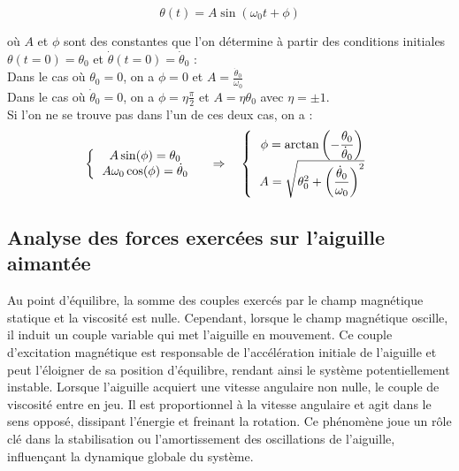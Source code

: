 \documentclass[a4paper,12pt,twoside]{article}
\begin{document}
\begin{equation}
    \theta(t) = A\sin(\omega_0t+\phi)
\end{equation}

\noindent où $A$ et $\phi$ sont des constantes que l'on détermine à partir des conditions initiales $\theta(t=0) = \theta_0$ et $\dot{\theta}(t=0) = \dot{\theta}_0$ :\\
Dans le cas où  $\theta_0 = 0$, on a $\phi = 0$ et $A = \frac{\dot{\theta}_0}{\omega_0}$ \\
Dans le cas où $\dot{\theta}_0 = 0$, on a $\phi =\eta \frac{\pi}{2}$ et $A = \eta\theta_0$ avec $\eta = \pm 1$. \\
Si l'on ne se trouve pas dans l'un de ces deux cas, on a :
\begin{equation}
    \left\{ \begin{tabular}{c}
      $A\sin(\phi)=\theta_0$     \\
      $A\omega_0\cos(\phi)=\dot{\theta}_0$ 
    \end{tabular}
    \right.
    \quad\Rightarrow\quad
    \left\{ \begin{tabular}{c}
      $\phi=\displaystyle\arctan\left(-\frac{\theta_0}{\dot{\theta}_0}\right)$     \\
      $A = \displaystyle\sqrt{\theta_0^2 + \left(\frac{\dot{\theta}_0}{\omega_0}\right)^2}$
    \end{tabular}
    \right.
\end{equation}

\subsection{Analyse des forces exercées sur l'aiguille aimantée}

Au point d'équilibre, la somme des couples exercés par le champ magnétique statique et la viscosité est nulle. Cependant, lorsque le champ magnétique oscille, il induit un couple variable qui met l'aiguille en mouvement. Ce couple d'excitation magnétique est responsable de l'accélération initiale de l'aiguille et peut l'éloigner de sa position d'équilibre, rendant ainsi le système potentiellement instable. Lorsque l'aiguille acquiert une vitesse angulaire non nulle, le couple de viscosité entre en jeu. Il est proportionnel à la vitesse angulaire et agit dans le sens opposé, dissipant l'énergie et freinant la rotation. Ce phénomène joue un rôle clé dans la stabilisation ou l’amortissement des oscillations de l’aiguille, influençant la dynamique globale du système.
\end{document}

